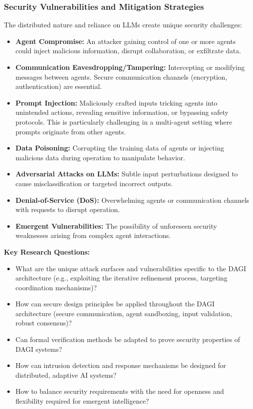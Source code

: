 \documentclass[12pt]{amsart}
\begin{document}
\subsubsection{Security Vulnerabilities and Mitigation Strategies}
\label{subsubsec:security_vulns}
The distributed nature and reliance on LLMs create unique security challenges:
\begin{itemize}[leftmargin=*]
    \item \textbf{Agent Compromise:} An attacker gaining control of one or more agents could inject malicious information, disrupt collaboration, or exfiltrate data.
    \item \textbf{Communication Eavesdropping/Tampering:} Intercepting or modifying messages between agents. Secure communication channels (encryption, authentication) are essential.
    \item \textbf{Prompt Injection:} Maliciously crafted inputs tricking agents into unintended actions, revealing sensitive information, or bypassing safety protocols. This is particularly challenging in a multi-agent setting where prompts originate from other agents.
    \item \textbf{Data Poisoning:} Corrupting the training data of agents or injecting malicious data during operation to manipulate behavior.
    \item \textbf{Adversarial Attacks on LLMs:} Subtle input perturbations designed to cause misclassification or targeted incorrect outputs.
    \item \textbf{Denial-of-Service (DoS):} Overwhelming agents or communication channels with requests to disrupt operation.
    \item \textbf{Emergent Vulnerabilities:} The possibility of unforeseen security weaknesses arising from complex agent interactions.
\end{itemize}
\textbf{Key Research Questions:}
\begin{itemize}[leftmargin=*, label={--}]
    \item What are the unique attack surfaces and vulnerabilities specific to the DAGI architecture (e.g., exploiting the iterative refinement process, targeting coordination mechanisms)?
    \item How can secure design principles be applied throughout the DAGI architecture (secure communication, agent sandboxing, input validation, robust consensus)?
    \item Can formal verification methods be adapted to prove security properties of DAGI systems?
    \item How can intrusion detection and response mechanisms be designed for distributed, adaptive AI systems?
    \item How to balance security requirements with the need for openness and flexibility required for emergent intelligence?
\end{itemize}
\end{document}
